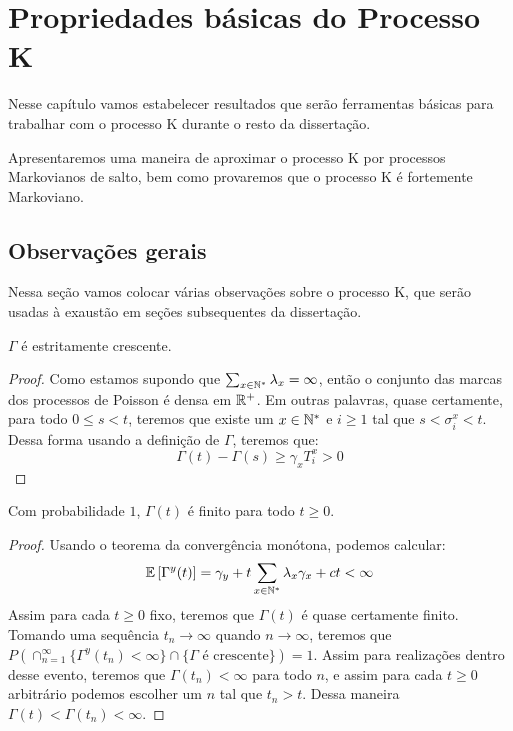 \chapter{Propriedades básicas do Processo K}
\label{cap:propriedades}

Nesse capítulo vamos estabelecer resultados que serão ferramentas
básicas para trabalhar com o processo K durante o resto da
dissertação.

Apresentaremos uma maneira de aproximar o processo K por processos
Markovianos de salto, bem como provaremos que o processo K é
fortemente Markoviano.


\section{Observações gerais}
\label{sec:observacoes}

Nessa seção vamos colocar várias observações sobre o processo K, que
serão usadas à exaustão em seções subsequentes da dissertação.

\begin{proposicao}
  \label{prop:gamma-crescente}
  $\Gamma$ é \qc estritamente crescente.
\end{proposicao}
\begin{proof}
  Como estamos supondo que $\sum_{x \in {\mathbb{N^*}}} \lambda_x = \infty$,
  então o conjunto das marcas dos processos de Poisson é \qc densa em
  ${\mathbb{R}}^+$. Em outras palavras, quase certamente, para todo $0 \leq s <
  t$, teremos que existe um $x \in {\mathbb{N^*}}$ e $i \geq 1$ tal que $s <
  \sigma^x_i < t$. Dessa forma usando a definição de $\Gamma$, teremos
  que:
  \begin{displaymath}
    \Gamma(t) - \Gamma(s) \geq \gamma_x T^x_i > 0
  \end{displaymath}
\end{proof}

\begin{proposicao}
  \label{prop:gamma-finita}
  Com probabilidade $1$, $\Gamma(t)$ é finito para todo $t \geq 0$.
\end{proposicao}
\begin{proof}
  Usando o teorema da convergência monótona, podemos calcular:
  \begin{displaymath}
    {\mathbb{E}} \left[\Gamma^y(t) \right] = \gamma_y + t \sum_{x \in {\mathbb{N^*}}}
    \lambda_x \gamma_x + ct < \infty
  \end{displaymath}
  Assim para cada $t \geq 0$ fixo, teremos que $\Gamma(t)$ é quase
  certamente finito. Tomando uma sequência $t_n \to \infty$ quando $n
  \to \infty$, teremos que $P(\cap_{n = 1}^{\infty} \{ \Gamma^y (t_n)
  < \infty \} \cap \{ \Gamma \textrm{ é crescente}\}) = 1$. Assim para
  realizações dentro desse evento, teremos que $\Gamma(t_n) < \infty$
  para todo $n$, e assim para cada $t \geq 0$ arbitrário podemos
  escolher um $n$ tal que $t_n > t$. Dessa maneira $\Gamma(t) <
  \Gamma(t_n) < \infty$.
\end{proof}


